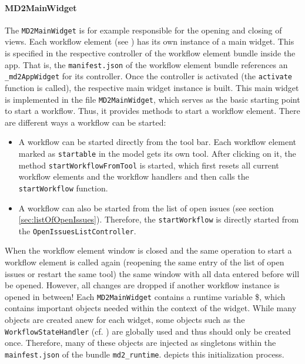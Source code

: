 \paragraph{MD2MainWidget}
The \lstinline!MD2MainWidget! is for example responsible for the opening and closing of views. 
Each workflow element (see ) has its own instance of a \MD main widget. This is specified in the respective controller of the workflow element bundle inside the app. That is, the \lstinline!manifest.json! of the workflow element bundle references an \lstinline!_md2AppWidget! for its controller. Once the controller is activated (\ie the \lstinline!activate! function is called), the respective \MD main widget instance is built. This \MD main widget is implemented in the file \lstinline!MD2MainWidget!, which serves as the basic starting point to start a workflow. Thus, it provides methods to start a workflow element. There are different ways a workflow can be started:
\begin{itemize}
	\item A workflow can be started directly from the \mapapps tool bar. Each workflow element marked as \lstinline|startable| in the model gets its own tool. After clicking on it, the method \lstinline|startWorkflowFrom|\lstinline|Tool| is started, which first resets all current workflow elements and the workflow handlers and then calls the \lstinline|startWorkflow| function.
	\item A workflow can also be started from the list of open issues (see section \ref{sec:listOfOpenIssues}). Therefore, the \lstinline|startWorkflow| is directly started from the \lstinline|OpenIssuesListController|.
\end{itemize}
When the workflow element window is closed and the same operation to start a workflow element is called again (reopening the same entry of the list of open issues or restart the same tool) the same window with all data entered before will be opened.
However, all changes are dropped if another workflow instance is opened in between!
Each \lstinline|MD2MainWidget| contains a runtime variable \$, which contains important objects needed within the context of the widget. While many objects are created anew for each widget, some objects such as the \lstinline|WorkflowStateHandler| (cf. ) are globally used and thus should only be created once. Therefore, many of these objects are injected as singletons within the \lstinline|mainfest.json| of the bundle \lstinline|md2_runtime|.
 depicts this initialization process.

